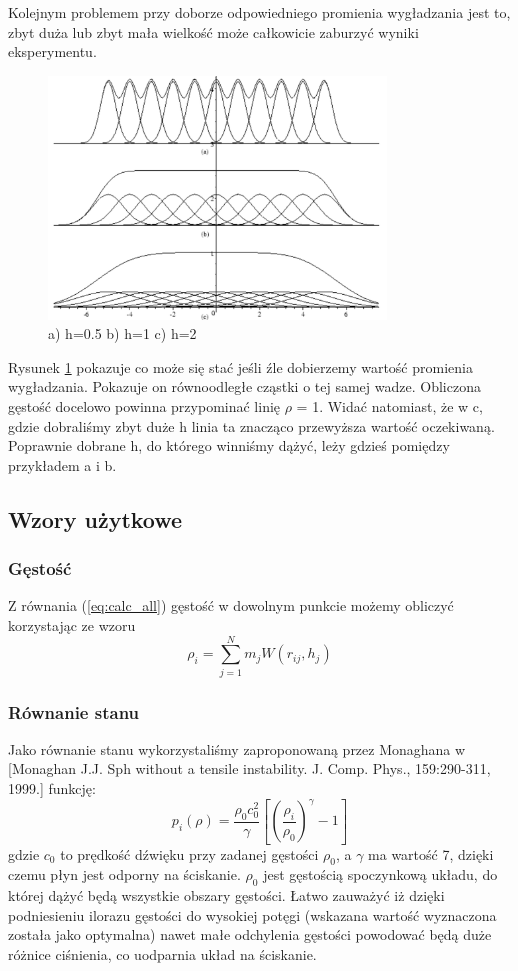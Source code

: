 \documentclass[polish, 12pt]{aghthesis}
\begin{document}
			Kolejnym problemem przy doborze odpowiedniego promienia wygładzania jest to, zbyt duża lub zbyt mała wielkość może całkowicie zaburzyć wyniki eksperymentu.
			\begin{figure}[h!]
			\centering
			\includegraphics[width=0.8\textwidth]{smoothing.png}
			\caption{a) h=0.5 b) h=1 c) h=2}
			\label{fig:smoothing}
			\end{figure}
			Rysunek \ref{fig:smoothing} pokazuje co może się stać jeśli źle dobierzemy wartość promienia wygładzania. Pokazuje on równoodległe cząstki o tej samej wadze. Obliczona gęstość docelowo powinna przypominać linię ${\rho}$ = 1. Widać natomiast, że w c, gdzie dobraliśmy zbyt duże h linia ta znacząco przewyższa wartość oczekiwaną. Poprawnie dobrane h, do którego winniśmy dążyć, leży gdzieś pomiędzy przykładem a i b.
			
		\subsection{Wzory użytkowe}
			\subsubsection{Gęstość}
			Z równania (\ref{eq:calc_all}) gęstość w dowolnym punkcie możemy obliczyć korzystając ze wzoru \[{\rho}_i=\sum_{j=1}^{N}m_jW(r_{ij},h_j) \label{eq:calc_density} \tag{8}\] 
			\subsubsection{Równanie stanu}
			Jako równanie stanu wykorzystaliśmy zaproponowaną przez Monaghana w [Monaghan J.J. Sph without a tensile instability. J. Comp. Phys., 159:290-311, 1999.] funkcję:
			\[p_i(\rho)=\frac{\rho_0 c_0^2}{\gamma}[(\frac{\rho_i}{\rho_0})^{\gamma} - 1] \label{eq:calc_state} \tag{8}\]
			gdzie ${c_0}$ to prędkość dźwięku przy zadanej gęstości ${\rho_0}$, a ${\gamma}$ ma wartość 7, dzięki czemu płyn jest odporny na ściskanie. $\rho_0$ jest gęstością spoczynkową układu, do której dążyć będą wszystkie obszary gęstości. Łatwo zauważyć iż dzięki podniesieniu ilorazu gęstości do wysokiej potęgi (wskazana wartość wyznaczona została jako optymalna) nawet małe odchylenia gęstości powodować będą duże różnice ciśnienia, co uodparnia układ na ściskanie.
			
\end{document}
